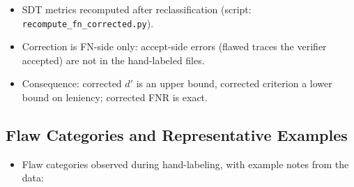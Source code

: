 \documentclass[12pt, a4paper, oneside]{report}
\begin{document}
\begin{itemize}
  \item SDT metrics recomputed after reclassification (script:
  \texttt{recompute\_fn\_corrected.py}).
  \item Correction is FN-side only: accept-side errors (flawed traces the
  verifier accepted) are not in the hand-labeled files.
  \item Consequence: corrected $d'$ is an upper bound, corrected criterion a
  lower bound on leniency; corrected FNR is exact.
\end{itemize}


\subsection{Flaw Categories and Representative Examples}


\begin{itemize}
  \item Flaw categories observed during hand-labeling, with example notes from
  the data:
\end{itemize}
\end{document}
